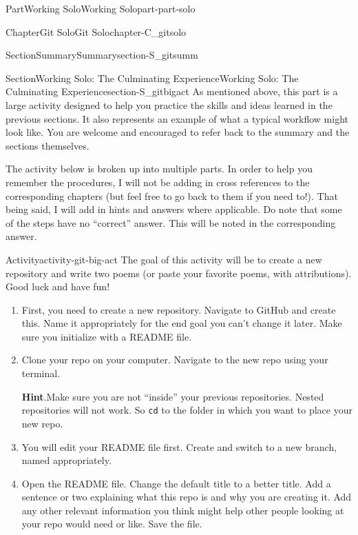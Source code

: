 \documentclass[oneside,10pt,]{book}
\newcommand{\blocktitlefont}{\relax}
\newcommand{\mono}[1]{\texttt{#1}}
\begin{document}
\begin{partptx}{Part}{Working Solo}{}{Working Solo}{}{}{part-part-solo}
\begin{chapterptx}{Chapter}{Git Solo}{}{Git Solo}{}{}{chapter-C_gitsolo}
\begin{sectionptx}{Section}{Summary}{}{Summary}{}{}{section-S_gitsumm}
%
\end{sectionptx}
%
%
\typeout{************************************************}
\typeout{************************************************}
%
\begin{sectionptx}{Section}{Working Solo: The Culminating Experience}{}{Working Solo: The Culminating Experience}{}{}{section-S_gitbigact}
%
As mentioned above, this part is a large activity designed to help you practice the skills and ideas learned in the previous sections. It also represents an example of what a typical workflow might look like. You are welcome and encouraged to refer back to the summary and the sections themselves.%
\par
The activity below is broken up into multiple parts. In order to help you remember the procedures, I will not be adding in cross references to the corresponding chapters (but feel free to go back to them if you need to!). That being said, I will add in hints and answers where applicable. Do note that some of the steps have no ``correct'' answer. This will be noted in the corresponding answer.%
\begin{activity}{Activity}{}{activity-git-big-act}%
The goal of this activity will be to create a new repository and write two poems (or paste your favorite poems, with attributions). Good luck and have fun!%
\begin{enumerate}[font=\bfseries,label=(\alph*),ref=\alph*]%
\item\label{task-git-ba-newrepo}First, you need to create a new repository. Navigate to GitHub and create this. Name it appropriately for the end goal \textemdash{} you can't change it later. Make sure you initialize with a README file.%
\item\label{task-git-ba-clone}Clone your repo on your computer. Navigate to the new repo using your terminal.%
\par\smallskip%
\noindent\textbf{\blocktitlefont Hint}.\hypertarget{hint-git-ba-clone-b}{}\quad{}Make sure you are not ``inside'' your previous repositories. Nested repositories will not work. So \mono{cd} to the folder in which you want to place your new repo.%
\item{}You will edit your README file first. Create and switch to a new branch, named appropriately.%
\item{}Open the README file. Change the default title to a better title. Add a sentence or two explaining what this repo is and why you are creating it. Add any other relevant information you think might help other people looking at your repo would need or like. Save the file.%

\end{enumerate}
\end{activity}
\end{sectionptx}
\end{chapterptx}
\end{partptx}
\end{document}
